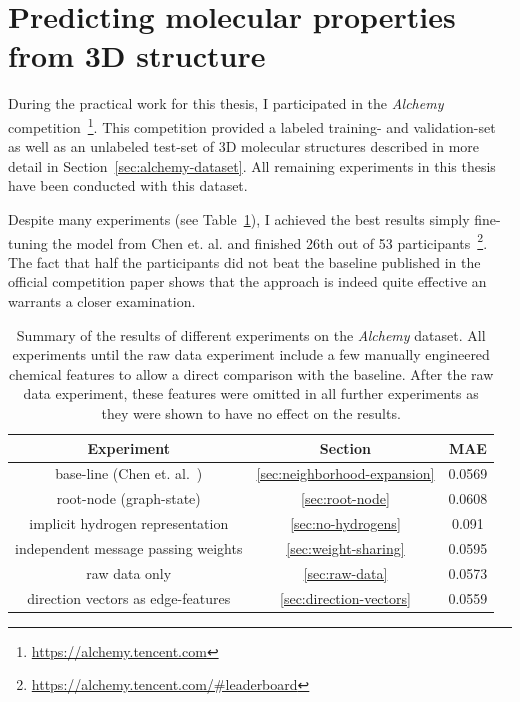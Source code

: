 \section{Predicting molecular properties from 3D structure}
\label{sec:alchemy}

During the practical work for this thesis, I participated in the \textit{Alchemy} competition~\footnote{\url{https://alchemy.tencent.com}}. This competition provided a labeled training- and validation-set as well as an unlabeled test-set of 3D molecular structures described in more detail in Section~\ref{sec:alchemy-dataset}. All remaining experiments in this thesis have been conducted with this dataset.

Despite many experiments (see Table~\ref{tab:alchemy-results}), I achieved the best results simply fine-tuning the model from Chen et. al.\cite{Chen2019} and finished 26th out of 53 participants~\footnote{\url{https://alchemy.tencent.com/\#leaderboard}}. The fact that half the participants did not beat the baseline published in the official competition paper shows that the approach is indeed quite effective an warrants a closer examination.




\begin{table}[H]
\begin{centering}
	\begin{tabular}{||c | c | c||} 
		\hline
		\textbf{Experiment} & \textbf{Section} & \textbf{MAE} \\ [0.5ex] 
		\hline\hline
		base-line (Chen et. al.~\cite{Chen2019})  & \ref{sec:neighborhood-expansion} & 0.0569 \\
		root-node (graph-state) & \ref{sec:root-node} & 0.0608 \\ 
		implicit hydrogen representation & \ref{sec:no-hydrogens} & 0.091 \\
		independent message passing weights & \ref{sec:weight-sharing} & 0.0595 \\
		raw data only & \ref{sec:raw-data} & 0.0573 \\
		direction vectors as edge-features & \ref{sec:direction-vectors} & 0.0559 \\ [1ex] 
		\hline
	\end{tabular}
	\vspace{0.5cm}
	\caption{Summary of the results of different experiments on the \textit{Alchemy} dataset. All experiments until the raw data experiment include a few manually engineered chemical features to allow a direct comparison with the baseline. After the raw data experiment, these features were omitted in all further experiments as they were shown to have no effect on the results.}
	\label{tab:alchemy-results}
\end{centering}
\end{table}


